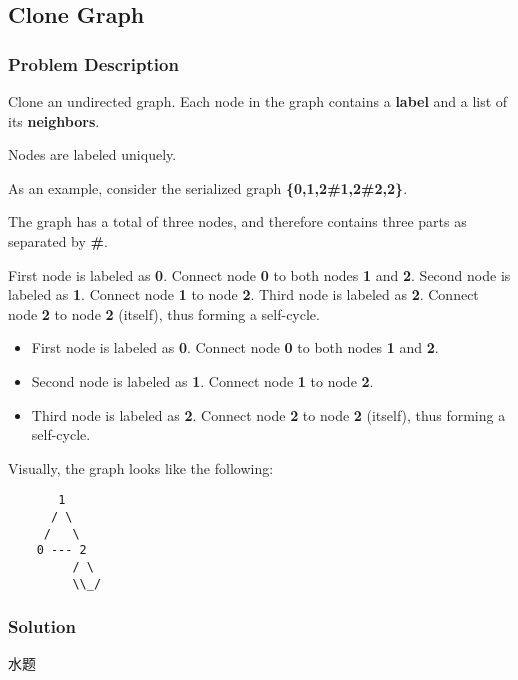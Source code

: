 \documentclass[courier]{article}
\begin{document}
\begin{CJK*}{UTF8}{gkai}
\subsection{ Clone Graph }

\subsubsection*{Problem Description}
Clone an undirected graph. Each node in the graph contains a \textbf{label} and a list of its \textbf{neighbors}.

Nodes are labeled uniquely.

As an example, consider the serialized graph \textbf{\{0,1,2\#1,2\#2,2\}}.

The graph has a total of three nodes, and therefore contains three parts as separated by \textbf{\#}.

First node is labeled as \textbf{0}. Connect node \textbf{0} to both nodes \textbf{1} and \textbf{2}.
Second node is labeled as \textbf{1}. Connect node \textbf{1} to node \textbf{2}.
Third node is labeled as \textbf{2}. Connect node \textbf{2} to node \textbf{2} (itself), thus forming a self-cycle.

\begin{itemize}
\item First node is labeled as \textbf{0}. Connect node \textbf{0} to both nodes \textbf{1} and \textbf{2}.
\item Second node is labeled as \textbf{1}. Connect node \textbf{1} to node \textbf{2}.
\item Third node is labeled as \textbf{2}. Connect node \textbf{2} to node \textbf{2} (itself), thus forming a self-cycle.
\end{itemize}

Visually, the graph looks like the following:
\begin{verbatim}
       1
      / \
     /   \
    0 --- 2
         / \
         \\_/
\end{verbatim}



\subsubsection*{Solution}
水题


\end{CJK*}
\end{document}
